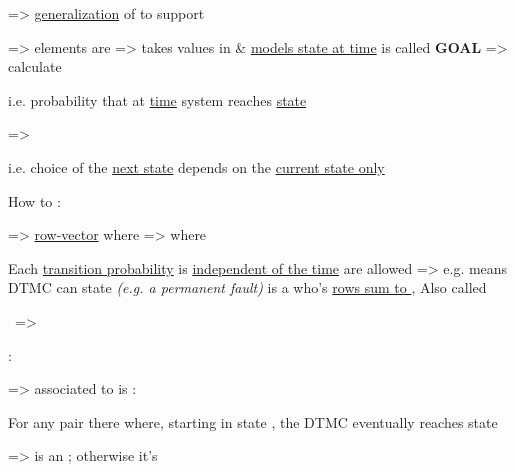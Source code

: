  => \ul{generalization} of  to
support 
\begin{enumerate}
    \vItem {}  => elements  are 
    \vItem {} => takes values in  \& \ul{models state at time} 
    \vItem {}  is called 
    \vItem \textbf{GOAL} => calculate 

    i.e. probability that at \ul{time}  system reaches \ul{state} 

    \vItem {} => 

    i.e. choice of the \ul{next state} depends on the \ul{current state only}


    \vItem How to :
    \begin{enumerate}
        \vItem {} =>
        \ul{row-vector}  where 
        \vItem {} => 
        where 
        \begin{enumerate}
            \vItem Each \ul{transition probability}  is \ul{independent of the time} 
            \vItem {} are allowed => e.g.  means DTMC can  state 
            \textit{(e.g. a permanent fault)}
            \vItem {} is a  who's \ul{rows sum to },
            \vItem Also called 
        \end{enumerate}
    \end{enumerate}

    \vItem {} \ => \
\end{enumerate}

\hSep

:
\begin{enumerate}
    \vItem {} =>  associated to  is :
    \begin{enumerate}
        \vItem For any pair  there  where,
        \vItem starting in state \iMbox{i}, the DTMC eventually reaches state 
    \end{enumerate}
    \vItem {} =>  is an ;
    otherwise it's \stb{aperiodic DTMC}
\end{enumerate}

